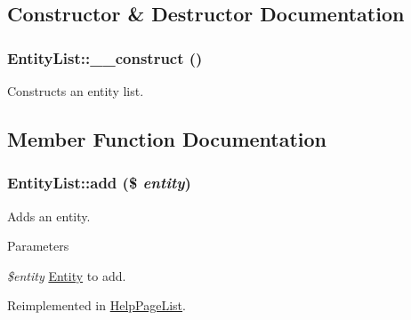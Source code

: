 \subsection{Constructor \& Destructor Documentation}
\hypertarget{classEntityList_ad54f70a37071343afd7cc87c01fa636e}{
\subsubsection[{\_\-\_\-construct}]{\setlength{\rightskip}{0pt plus 5cm}EntityList::\_\-\_\-construct ()}}
\label{classEntityList_ad54f70a37071343afd7cc87c01fa636e}
Constructs an entity list. 

\subsection{Member Function Documentation}
\hypertarget{classEntityList_a65960f27e39a393fb9554f725c333e12}{
\subsubsection[{add}]{\setlength{\rightskip}{0pt plus 5cm}EntityList::add (\$ {\em entity})}}
\label{classEntityList_a65960f27e39a393fb9554f725c333e12}
Adds an entity.


\begin{DoxyParams}{Parameters}
\item[{\em \$entity}]\hyperlink{classEntity}{Entity} to add. \end{DoxyParams}


Reimplemented in \hyperlink{classHelpPageList_a62cb7a8510dd50d965e67e9ff97b5f64}{HelpPageList}.

